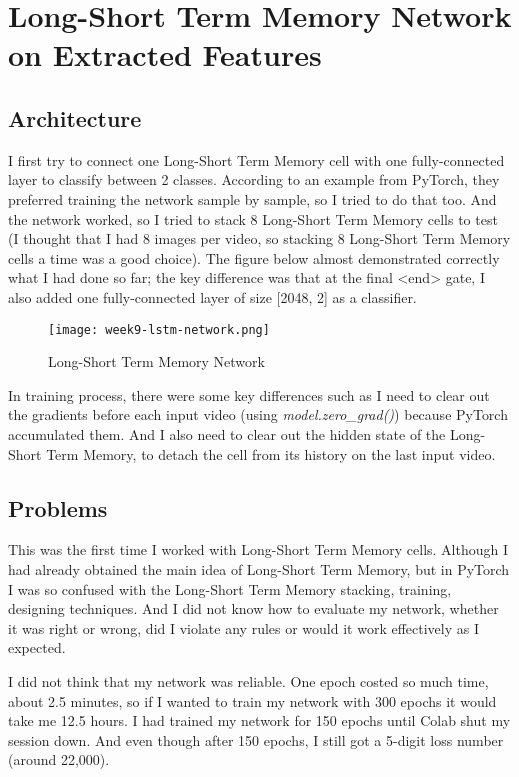 \section{Long-Short Term Memory Network on Extracted Features}
\subsection{Architecture}
I first try to connect one Long-Short Term Memory\cite{lstm} cell with one fully-connected layer to classify between 2 classes. According to an example from PyTorch, they preferred training the network sample by sample, so I tried to do that too. And the network worked, so I tried to stack 8 Long-Short Term Memory cells to test (I thought that I had 8 images per video, so stacking 8 Long-Short Term Memory cells a time was a good choice). The figure below almost demonstrated correctly what I had done so far; the key difference was that at the final <end> gate, I also added one fully-connected layer of size [2048, 2] as a classifier.

\begin{figure}[!ht]
\centering
\texttt{[image: week9-lstm-network.png]}
\caption{Long-Short Term Memory Network}
\end{figure}

In training process, there were some key differences such as I need to clear out the gradients before each input video (using \emph{model.zero\_grad()}) because PyTorch accumulated them. And I also need to clear out the hidden state of the Long-Short Term Memory, to detach the cell from its history on the last input video.

\subsection{Problems}
This was the first time I worked with Long-Short Term Memory cells. Although I had already obtained the main idea of Long-Short Term Memory, but in PyTorch I was so confused with the Long-Short Term Memory stacking, training, designing techniques. And I did not know how to evaluate my network, whether it was right or wrong, did I violate any rules or would it work effectively as I expected.

I did not think that my network was reliable. One epoch costed so much time, about 2.5 minutes, so if I wanted to train my network with 300 epochs it would take me 12.5 hours. I had trained my network for 150 epochs until Colab shut my session down. And even though after 150 epochs, I still got a 5-digit loss number (around 22,000).